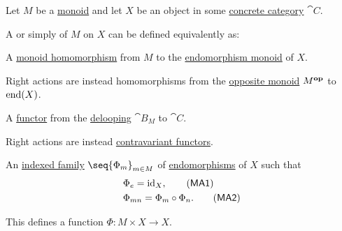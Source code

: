 \begin{definition}\label{def:monoid_action}\mimprovised
  Let \( M \) be a \hyperref[def:monoid]{monoid} and let \( X \) be an object in some \hyperref[def:concrete_category]{concrete category} \( \cat{C} \).

  A  or simply  of \( M \) on \( X \) can be defined equivalently as:
  \begin{thmenum}
     A \hyperref[def:monoid/homomorphism]{monoid homomorphism} from \( M \) to the \hyperref[def:endomorphism_monoid]{endomorphism monoid} of \( X \).

    Right actions are instead homomorphisms from the \hyperref[def:monoid/opposite]{opposite monoid} \( M^\oppos \) to \( \operatorname{end}(X) \).

     A \hyperref[def:functor]{functor} from the \hyperref[def:monoid_delooping]{delooping} \( \cat{B}_M \) to \( \cat{C} \).

    Right actions are instead \hyperref[rem:contravariant_functor]{contravariant functors}.

     An \hyperref[def:indexed_family]{indexed family} \( \seq{ \Phi_m }_{m \in M} \) of \hyperref[def:morphism_invertibility/endomorphism]{endomorphisms} of \( X \) such that
    \begin{align}
      &\Phi_e = \id_X, \label{eq:def:monoid_action/family/identity}\tag{\logic{MA1}} \\
      &\Phi_{mn} = \Phi_m \bincirc \Phi_n. \label{eq:def:monoid_action/family/compatibility}\tag{\logic{MA2}}
    \end{align}

    This defines a function \( \Phi: M \times X \to X \).
  \end{thmenum}
\end{definition}
